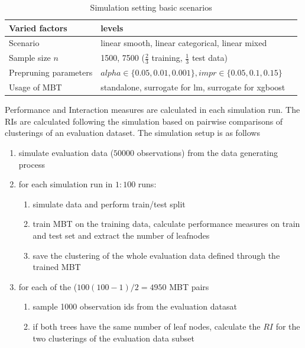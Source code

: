 \begin{table}[!htb] 
\centering \small
\begin{tabular}[t]{lll}
\hline
Varied factors & levels \\
\hline
Scenario  & linear smooth, linear categorical, linear mixed\\
Sample size $n$  & 1500, 7500 ($\frac{2}{3}$  training, $\frac{1}{3}$ test data)\\
Prepruning parameters   & $alpha \in \{0.05,0.01,0.001\}, impr \in \{0.05,0.1,0.15\}$ \\
Usage of MBT  & standalone, surrogate for lm, surrogate for xgboost \\ 
\hline
\end{tabular}
\caption{Simulation setting basic scenarios}
\label{tab:simulation_setting}
\end{table}

Performance and Interaction measures are calculated in each simulation run.  
The RIs are calculated following the simulation based on pairwise comparisons of clusterings of an evaluation dataset. The simulation setup is as follows

\begin{enumerate}
    \item simulate evaluation data ($50000$ observations) from the data generating process
    \item for each simulation run in $1:100$ runs:
    \begin{enumerate}
        \item simulate data and perform train/test split
        \item train MBT on the training data, calculate performance measures on train and test set and extract the number of leafnodes
        \item save the clustering of the whole evaluation data defined through the trained MBT
    \end{enumerate}
    \item for each of the ($100(100-1)/2 = 4950$ MBT pairs
    \begin{enumerate}
        \item sample 1000 observation ids from the evaluation datasat
        \item if both trees have the same number of leaf nodes, calculate the $RI$ for the two clusterings of the evaluation data subset
    \end{enumerate}
\end{enumerate}


